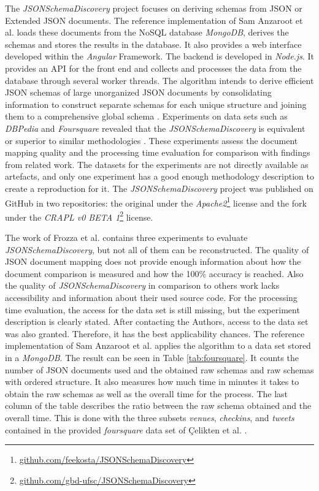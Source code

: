 \documentclass[sigconf, nonacm]{acmart}
\begin{document}
The \textit{JSONSchemaDiscovery} project focuses on deriving schemas from JSON or Extended JSON documents. The reference implementation of Sam Anzaroot et al. \cite{JSONSchemaDiscovery2013} loads these documents from the NoSQL database \textit{MongoDB}, derives the schemas and stores the results in the database. It also provides a web interface developed within the \textit{Angular} Framework. The backend is developed in \textit{Node.js}. It provides an API for the front end and collects and processes the data from the database through several worker threads. The algorithm intends to derive efficient JSON schemas of large unorganized JSON documents by consolidating information to construct separate schemas for each unique structure and joining them to a comprehensive global schema \cite{8424731}. Experiments on data sets such as \textit{DBPedia} and \textit{Foursquare} revealed that the \textit{JSONSchemaDiscovery} is equivalent or superior to similar methodologies \cite{8424731}. These experiments assess the document mapping quality and the processing time evaluation for comparison with findings from related work. The datasets for the experiments are not directly available as artefacts, and only one experiment has a good enough methodology description to create a reproduction for it. The \textit{JSONSchemaDiscovery} project was published on GitHub in two repositories: the original under the \textit{Apache2}\footnote{\url{github.com/feekosta/JSONSchemaDiscovery}} license and the fork under the \textit{CRAPL v0 BETA 1}\footnote{\url{github.com/gbd-ufsc/JSONSchemaDiscovery}} license.

The work of Frozza et al. \cite{8424731} contains three experiments to evaluate \textit{JSONSchemaDiscovery}, but not all of them can be reconstructed. The quality of JSON document mapping does not provide enough information about how the document comparison is measured and how the 100\% accuracy is reached. Also the quality of \textit{JSONSchemaDiscovery} in comparison to others work lacks accessibility and information about their used source code. For the processing time evaluation, the access for the data set is still missing, but the experiment description is clearly stated. After contacting the Authors, access to the data set was also granted. Therefore, it has the best applicability chances. The reference implementation of Sam Anzaroot et al. \cite{JSONSchemaDiscovery2013} applies the algorithm to a data set stored in a \textit{MongoDB}. The result can be seen in Table \ref{tab:foursquare}. It counts the number of JSON documents used and the obtained raw schemas and raw schemas with ordered structure. It also measures how much time in minutes it takes to obtain the raw schemas as well as the overall time for the process. The last column of the table describes the ratio between the raw schema obtained and the overall time. This is done with the three subsets \textit{venues}, \textit{checkins}, and \textit{tweets} contained in the provided \textit{foursquare} data set of Çelikten et al. \cite{ccelikten2016modeling}.
\end{document}
